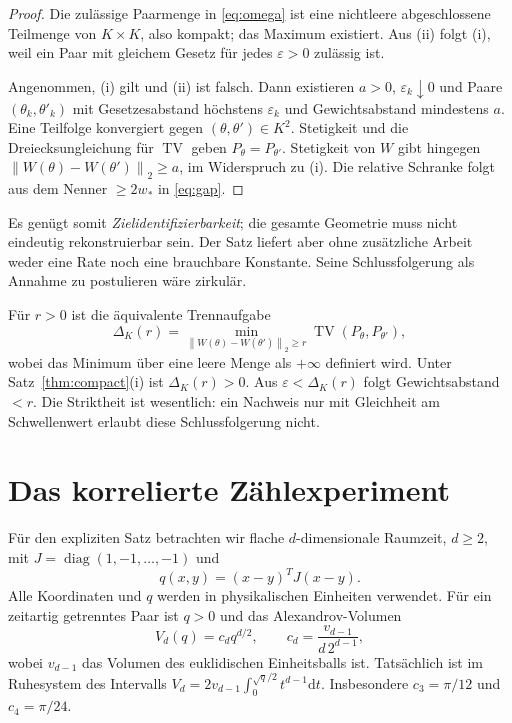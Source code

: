 \documentclass[11pt,a4paper]{article}
\theoremstyle{definition}\newtheorem{definition}{Definition}
\theoremstyle{remark}\newtheorem*{remark}{Bemerkung}
\newcommand{\TV}{\operatorname{TV}}
\newcommand{\norm}[1]{\left\lVert#1\right\rVert}
\newcommand{\dd}{\mathrm{d}}
\newcommand{\diag}{\operatorname{diag}}
\begin{document}
\begin{proof}
Die zulässige Paarmenge in \eqref{eq:omega} ist eine nichtleere abgeschlossene Teilmenge von $K\times K$, also kompakt; das Maximum existiert. Aus (ii) folgt (i), weil ein Paar mit gleichem Gesetz für jedes $\varepsilon>0$ zulässig ist.

Angenommen, (i) gilt und (ii) ist falsch. Dann existieren $a>0$, $\varepsilon_k\downarrow0$ und Paare $(\theta_k,\theta'_k)$ mit Gesetzesabstand höchstens $\varepsilon_k$ und Gewichtsabstand mindestens $a$. Eine Teilfolge konvergiert gegen $(\theta,\theta')\in K^2$. Stetigkeit und die Dreiecksungleichung für $\TV$ geben $P_\theta=P_{\theta'}$. Stetigkeit von $W$ gibt hingegen $\norm{W(\theta)-W(\theta')}_2\geq a$, im Widerspruch zu (i). Die relative Schranke folgt aus dem Nenner $\geq2w_*$ in \eqref{eq:gap}.
\end{proof}

Es genügt somit \emph{Zielidentifizierbarkeit}; die gesamte Geometrie muss nicht eindeutig rekonstruierbar sein. Der Satz liefert aber ohne zusätzliche Arbeit weder eine Rate noch eine brauchbare Konstante. Seine Schlussfolgerung als Annahme zu postulieren wäre zirkulär.

Für $r>0$ ist die äquivalente Trennaufgabe
\begin{equation}\label{eq:separation}
 \Delta_K(r)=\min_{\norm{W(\theta)-W(\theta')}_2\geq r}
                  \TV(P_\theta,P_{\theta'}),
\end{equation}
wobei das Minimum über eine leere Menge als $+\infty$ definiert wird. Unter Satz~\ref{thm:compact}(i) ist $\Delta_K(r)>0$. Aus $\varepsilon<\Delta_K(r)$ folgt Gewichtsabstand $<r$. Die Striktheit ist wesentlich: ein Nachweis nur mit Gleichheit am Schwellenwert erlaubt diese Schlussfolgerung nicht.

\section{Das korrelierte Zählexperiment}

Für den expliziten Satz betrachten wir flache $d$-dimensionale Raumzeit, $d\geq2$, mit
$J=\diag(1,-1,\ldots,-1)$ und
\[
 q(x,y)=(x-y)^TJ(x-y).
\]
Alle Koordinaten und $q$ werden in physikalischen Einheiten verwendet. Für ein zeitartig getrenntes Paar ist $q>0$ und das Alexandrov-Volumen
\begin{equation}\label{eq:volume}
 V_d(q)=c_d q^{d/2},\qquad
 c_d=\frac{v_{d-1}}{d\,2^{d-1}},
\end{equation}
wobei $v_{d-1}$ das Volumen des euklidischen Einheitsballs ist. Tatsächlich ist im Ruhesystem des Intervalls $V_d=2v_{d-1}\int_0^{\sqrt q/2}t^{d-1}\dd t$.
Insbesondere $c_3=\pi/12$ und $c_4=\pi/24$.
\end{document}

